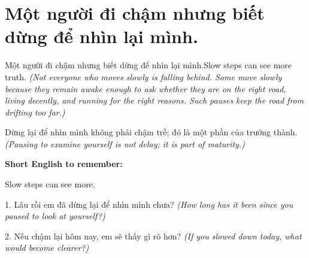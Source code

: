 \section{Một người đi chậm nhưng biết dừng để nhìn lại mình.}
\begin{truyen}{Một người đi chậm nhưng biết dừng để nhìn lại mình.}{Slow steps can see more truth.}
\textit{(Not everyone who moves slowly is falling behind. Some move slowly because they remain awake enough to ask whether they are on the right road, living decently, and running for the right reasons. Such pauses keep the road from drifting too far.)}
\end{truyen}
\begin{baihoc}
Dừng lại để nhìn mình không phải chậm trễ; đó là một phần của trưởng thành.
\textit{(Pausing to examine yourself is not delay; it is part of maturity.)}
\end{baihoc}
\begin{ghinhoanh}
\textbf{Short English to remember:}

Slow steps can see more.
\end{ghinhoanh}
\begin{tuhocnhanh}
1. Lâu rồi em đã dừng lại để nhìn mình chưa? \textit{(How long has it been since you paused to look at yourself?)}

2. Nếu chậm lại hôm nay, em sẽ thấy gì rõ hơn? \textit{(If you slowed down today, what would become clearer?)}
\end{tuhocnhanh}
\ngancach
